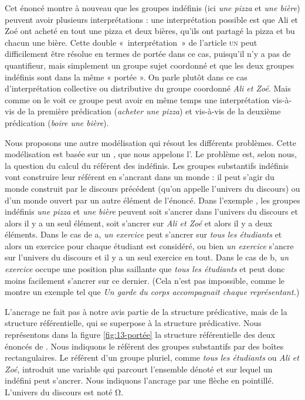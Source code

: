 {Cet énoncé montre à nouveau que les groupes indéfinis (ici \textit{une pizza} et \textit{une bière}) peuvent avoir plusieurs interprétations : une interprétation possible est que Ali et Zoé ont acheté en tout une pizza et deux bières, qu’ils ont partagé la pizza et bu chacun une bière. Cette double «~interprétation~» de l’article \textsc{un} peut difficilement être résolue en termes de portée dans ce cas, puisqu’il n’y a pas de quantifieur, mais simplement un groupe sujet coordonné et que les deux groupes indéfinis sont dans la même « portée ». On parle plutôt dans ce cas d’interprétation collective ou distributive du groupe coordonné \textit{Ali et Zoé}. Mais comme on le voit ce groupe peut avoir en même temps une interprétation  vis-à-vis de la première prédication (\textit{acheter une pizza}) et  vis-à-vis de la deuxième prédication (\textit{boire une bière}).

Nous proposons une autre modélisation qui résout les différents problèmes. Cette modélisation est basée sur un , que nous appelons l’. Le problème est, selon nous, la question du calcul du référent des indéfinis. Les groupes substantifs indéfinis vont construire leur référent en s’ancrant dans un monde : il peut s’agir du monde construit par le discours précédent (qu’on appelle l’univers du discours) ou d’un monde ouvert par un autre élément de l’énoncé. Dans l’exemple , les groupes indéfinis \textit{une pizza} et \textit{une bière} peuvent soit s’ancrer dans l’univers du discours et alors il y a un seul élément, soit s’ancrer sur \textit{Ali et Zoé} et alors il y a deux éléments. Dans le cas de a, \textit{un exercice} peut s’ancrer sur \textit{tous les étudiants} et alors un exercice pour chaque étudiant est considéré, ou bien \textit{un exercice} s’ancre sur l’univers du discours et il y a un seul exercice en tout. Dans le cas de b, \textit{un exercice} occupe une position plus saillante que \textit{tous les étudiants} et peut donc moins facilement s’ancrer sur ce dernier. (Cela n’est pas impossible, comme le montre un exemple tel que \textit{Un garde du corps accompagnait chaque représentant.}) 

L’ancrage ne fait pas à notre avis partie de la structure prédicative, mais de la structure référentielle, qui se superpose à la structure prédicative. Nous représentons dans la figure \ref{fig:13-portée} la structure référentielle des deux énoncés de . Nous indiquons le référent des groupes substantifs par des boîtes rectangulaires. Le référent d’un groupe pluriel, comme \textit{tous les étudiants} ou \textit{Ali et Zoé}, introduit une variable qui parcourt l’ensemble dénoté et sur lequel un indéfini peut s’ancrer. Nous indiquons l’ancrage par une flèche en pointillé. L’univers du discours est noté Ω.

}
